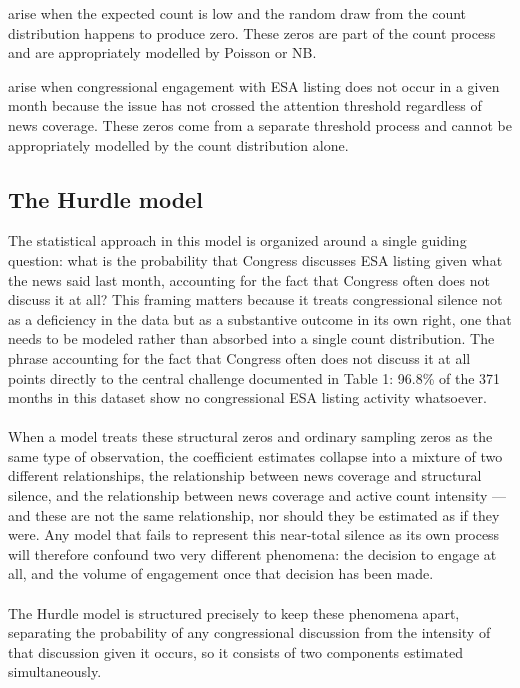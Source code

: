 \documentclass[11pt]{article}
\begin{document}
\begin{description}[leftmargin=0pt, itemsep=2pt]
  \item[\textbf{Sampling zeros}] arise when the expected count is low
    and the random draw from the count distribution happens to produce
    zero. These zeros are part of the count process and are
    appropriately modelled by Poisson or NB.
  \item[\textbf{Structural zeros}] arise when congressional engagement
    with ESA listing does not occur in a given month because the issue
    has not crossed the attention threshold regardless of news
    coverage. These zeros come from a separate threshold process and
    cannot be appropriately modelled by the count distribution alone.
\end{description}

\subsection{The Hurdle model}
The statistical approach in this model  is organized around a single guiding question: what is the probability that Congress discusses ESA listing given what the news said last month, accounting for the fact that Congress often does not discuss it at all? This framing matters because it treats congressional silence not as a deficiency in the data but as a substantive outcome in its own right, one that needs to be modeled rather than absorbed into a single count distribution. The phrase accounting for the fact that Congress often does not discuss it at all points directly to the central challenge documented in Table 1: 96.8\% of the 371 months in this dataset show no congressional ESA listing activity whatsoever. \\
\\
When a model treats these structural zeros and ordinary sampling zeros as the same type of observation, the coefficient estimates collapse into a mixture of two different relationships, the relationship between news coverage and structural silence, and the relationship between news coverage and active count intensity — and these are not the same relationship, nor should they be estimated as if they were. Any model that fails to represent this near-total silence as its own process will therefore confound two very different phenomena: the decision to engage at all, and the volume of engagement once that decision has been made.\\
\\
The Hurdle model \citep{Mullahy1986, Zeileis2008} is structured precisely to keep these phenomena apart, separating the probability of any congressional discussion from the intensity of that discussion given it occurs, so it consists of two components estimated simultaneously.\\
\end{document}
